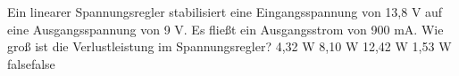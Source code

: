     {Ein linearer Spannungsregler stabilisiert eine Eingangsspannung von 13,8 V auf eine Ausgangsspannung von 9 V. Es fließt ein Ausgangsstrom von 900 mA. Wie groß ist die Verlustleistung im Spannungsregler?}
    {4,32 W}
    {8,10 W}
    {12,42 W}
    {1,53 W}
    {false}{false}